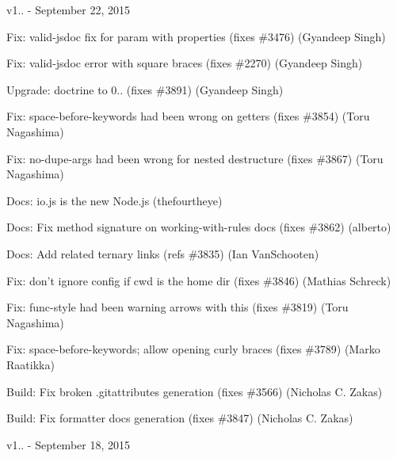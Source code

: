v1.. -\/ September 22, 2015


\begin{DoxyItemize}
\item Fix\+: valid-\/jsdoc fix for param with properties (fixes \#3476) (Gyandeep Singh)
\item Fix\+: valid-\/jsdoc error with square braces (fixes \#2270) (Gyandeep Singh)
\item Upgrade\+: {\ttfamily doctrine} to 0.. (fixes \#3891) (Gyandeep Singh)
\item Fix\+: {\ttfamily space-\/before-\/keywords} had been wrong on getters (fixes \#3854) (Toru Nagashima)
\item Fix\+: {\ttfamily no-\/dupe-\/args} had been wrong for nested destructure (fixes \#3867) (Toru Nagashima)
\item Docs\+: io.\+js is the new Node.\+js (thefourtheye)
\item Docs\+: Fix method signature on working-\/with-\/rules docs (fixes \#3862) (alberto)
\item Docs\+: Add related ternary links (refs \#3835) (Ian Van\+Schooten)
\item Fix\+: don’t ignore config if cwd is the home dir (fixes \#3846) (Mathias Schreck)
\item Fix\+: {\ttfamily func-\/style} had been warning arrows with {\ttfamily this} (fixes \#3819) (Toru Nagashima)
\item Fix\+: {\ttfamily space-\/before-\/keywords}; allow opening curly braces (fixes \#3789) (Marko Raatikka)
\item Build\+: Fix broken .gitattributes generation (fixes \#3566) (Nicholas C. Zakas)
\item Build\+: Fix formatter docs generation (fixes \#3847) (Nicholas C. Zakas)
\end{DoxyItemize}

v1.. -\/ September 18, 2015


